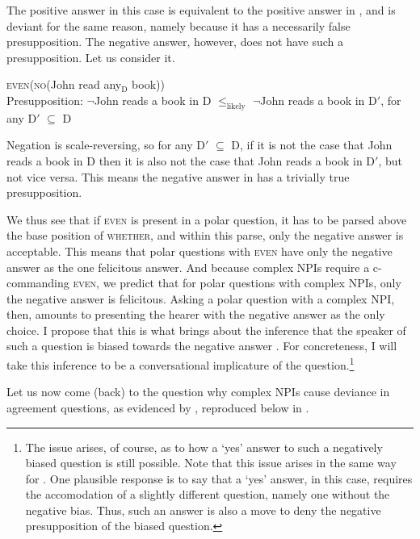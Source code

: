 \documentclass[output=paper,colorlinks,citecolor=brown]{langscibook}
\begin{document}
The positive answer in this case is equivalent to the positive answer in , and is deviant for the same reason, namely because it has a necessarily false presupposition. The negative answer, however, does not have such a presupposition. Let us consider it.

\ea \label{neganswer}
\textsc{even}(\textsc{no}(John read any$_{\text{D}}$ book))\\
Presupposition: $\neg$John reads a book in D $\leq_\text{likely}$ $\neg$John reads a book in D$'$, for any D$'$ $\subseteq$ D\label{truepresup}
\z

Negation is scale-reversing, so for any D$'$ $\subseteq$ D, if it is not the case that John reads a book in D then it is also not the case that John reads a book in D$'$, but not vice versa. This means the negative answer in  has a trivially true presupposition.

We thus see that if \textsc{even} is present in a polar question, it has to be parsed above the base position of \textsc{whether}, and within this parse, only the negative answer is acceptable. This means that polar questions with \textsc{even} have only the negative answer as the one felicitous answer. And because complex NPIs require a c-commanding \textsc{even}, we predict that for polar questions with complex NPIs, only the negative answer is felicitous. Asking a polar question with a complex NPI, then, amounts to presenting the hearer with the negative answer as the only choice. I propose that this is what brings about the inference that the speaker of such a question is biased towards the negative answer \citep[cf.][]{Guerzoni:2004}. For concreteness, I will take this inference to be a conversational implicature of the question.\footnote{The issue arises, of course, as to how a `yes' answer to such a negatively biased question is still possible. Note that this issue arises in the same way for \citet[][]{Guerzoni:2004}. One plausible response is to say that a `yes' answer, in this case, requires the accomodation of a slightly different question, namely one without the negative bias. Thus, such an answer is also a move to deny the negative presupposition of the biased question.} 


Let us now come (back) to the question why complex NPIs cause deviance in agreement questions, as evidenced by , reproduced below in .
\end{document}
